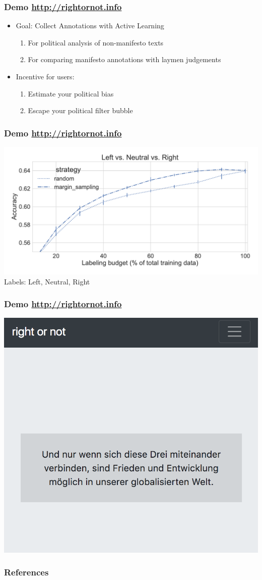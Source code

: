 \documentclass[]{beamer}
\begin{document}
\begin{frame}\frametitle{Demo \url{http://rightornot.info}}
\begin{itemize}
\item Goal: Collect Annotations with Active Learning
\begin{enumerate}
\item For political analysis of non-manifesto texts
\item For comparing manifesto annotations with laymen judgements
\end{enumerate}
\item Incentive for users: 
\begin{enumerate}
\item Estimate your political bias
\item Escape your political filter bubble
\end{enumerate}
\end{itemize}
\centering
\end{frame}


\begin{frame}\frametitle{Demo \url{http://rightornot.info}}
\centering 
\includegraphics[width=.9\textwidth]{images/active_learning_manifesto-left-neutral-right}\\
Labels: Left, Neutral, Right
\end{frame}

\begin{frame}\frametitle{Demo \url{http://rightornot.info}}
\centering 
\includegraphics[width=.6\textwidth]{images/web-demo}\\
\end{frame}

\begin{frame}\frametitle{References}


\def\newblock{}
\vspace{2em}
 
\end{frame}
\end{document}
